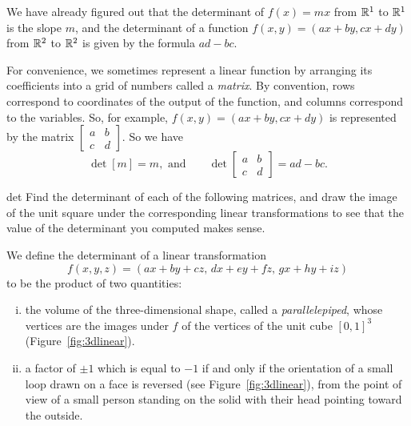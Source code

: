\documentclass[prettycode,shellescape]{watsonbook}
\begin{document}
We have already figured out that the determinant of $f(x) = mx$ from
$\mathbb{R}^1$ to $\mathbb{R}^1$ is the slope $m$, and the determinant of a function
$f(x,y) = (ax + by, cx + dy)$ from $\mathbb{R}^2$ to $\mathbb{R}^2$ is given by the
formula $ad - bc$.

For convenience, we sometimes represent a linear function by arranging
its coefficients into a grid of numbers called a \textit{matrix}. By
convention, rows correspond to coordinates of the output of the
function, and columns correspond to the variables. So, for example,
$f(x,y) = (ax + by, cx + dy)$ is represented by the matrix
$\left[\begin{array}{cc} a & b \\ c & d \end{array}\right]$. So we
have
\[
  \det [m] = m, \text{ and} \qquad \det \left[\begin{array}{cc} a & b \\ c & d \end{array}\right] = ad - bc. 
\]

\begin{exercise}{}{det}
  Find the determinant of each of the following matrices, and draw the
  image of the unit square under the corresponding linear
  transformations to see that the value of the determinant you
  computed makes sense.

  \pairofprobs{$\left[\begin{array}{cc} 1 & 0 \\ 0 & -1 \end{array}\right]$}{
    $\left[\begin{array}{cc} 2 & 1 \\ 0 & 2 \end{array}\right]$}

  \pairofprobs{$\left[\begin{array}{cc} 0 & 1 \\ -1 & 0 \end{array}\right]$}{
    $\left[\begin{array}{cc} 2 & 1  \\ 4 & 2 \end{array}\right]$}
\end{exercise}

We define the determinant of a linear transformation 
\[
  f(x,y,z) = (ax + by + cz, \, dx + ey + fz,\, gx + hy  + iz)
\]
to be the product of two quantities:
\begin{enumerate}[(i),topsep=-6pt]
  \item the volume of the three-dimensional shape, called a
    \textit{parallelepiped}, whose vertices are the images under $f$
    of the vertices of the unit cube $[0,1]^3$
    (Figure~\ref{fig:3dlinear}).
  \item a factor of
    $\pm1$ which is equal to $-1$ if and only if the orientation of a
    small loop drawn on a face is reversed (see
    Figure~\ref{fig:3dlinear}), from the point of view of a small
    person standing on the solid with their head pointing toward the
    outside.
\end{enumerate}
\end{document}
